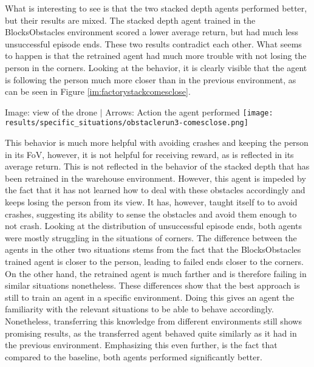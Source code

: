 What is interesting to see is that the two stacked depth agents performed better, but
their results are mixed. The stacked depth agent trained in the BlocksObstacles environment 
scored a lower average return, but had much less unsuccessful episode ends. These 
two results contradict each other. What seems to happen is that the retrained agent 
had much more trouble with not losing the person in the corners. Looking at the behavior, 
it is clearly visible that the agent is following the person much more closer than 
in the previous environment, as can be seen in Figure \ref{im:factorystackcomesclose}. 

\begin{Figure}
    \centering
    \small
    Image: view of the drone $|$ Arrows: Action the agent performed
    \texttt{[image: results/specific\_situations/obstaclerun3-comesclose.png]}
    \label{im:factorystackcomesclose}
\end{Figure}

This behavior is much more helpful with avoiding crashes and keeping the person in 
its FoV, however, it is not helpful for receiving reward, as is reflected in its 
average return. This is not reflected in the behavior of the stacked depth that 
has been retrained in the warehouse environment. However, this agent is impeded 
by the fact that it has not learned how to deal with these obstacles accordingly 
and keeps losing the person from its view. It has, however, taught itself to 
to avoid crashes, suggesting its ability to sense the obstacles and 
avoid them enough to not crash. Looking at the distribution of unsuccessful episode ends, 
both agents were 
mostly struggling in the situations of corners. The difference 
between the agents in the other two situations stems from the fact that the 
BlocksObstacles trained agent is closer to the person, leading to failed ends 
closer to the corners. On the other hand, the retrained agent is much farther 
and is therefore failing in similar situations nonetheless. 
These differences show that the best approach is 
still to train an agent in a specific environment. Doing this gives an agent 
the familiarity with the relevant situations to be able to behave accordingly. 
Nonetheless, transferring this knowledge from different environments still shows 
promising results, as the transferred agent behaved quite similarly as it had in 
the previous environment. Emphasizing this even further, is the fact that compared to the 
baseline, both agents performed significantly better. 

